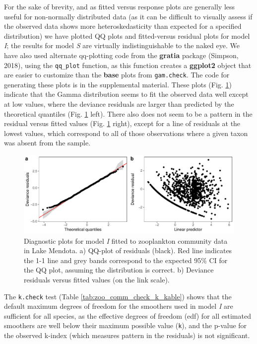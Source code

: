\documentclass[12pt]{article}
\begin{document}
For the sake of brevity, and as fitted versus response plots are
generally less useful for non-normally distributed data (as it can be
difficult to visually assess if the observed data shows more
heteroskedasticity than expected for a specified distribution) we have
plotted QQ plots and fitted-versus residual plots for model \emph{I};
the results for model \emph{S} are virtually indistinguishable to the
naked eye. We have also used alternate qq-plotting code from the
\textbf{gratia} package (Simpson, 2018), using the \texttt{qq\_plot}
function, as this function creates a \textbf{ggplot2} object that are
easier to customize than the \textbf{base} plots from
\texttt{gam.check}. The code for generating these plots is in the
supplemental material. These plots (Fig. \ref{fig:zoo_comm_diag_plot})
indicate that the Gamma distribution seems to fit the observed data well
except at low values, where the deviance residuals are larger than
predicted by the theoretical quantiles (Fig.
\ref{fig:zoo_comm_diag_plot} left). There also does not seem to be a
pattern in the residual versus fitted values (Fig.
\ref{fig:zoo_comm_diag_plot} right), except for a line of residuals at
the lowest values, which correspond to all of those observations where a
given taxon was absent from the sample.

\begin{figure}
\centering
\includegraphics{../figures/zoo_comm_diag-1.pdf}
\caption{\label{fig:zoo_comm_diag_plot} Diagnostic plots for model
\emph{I} fitted to zooplankton community data in Lake Mendota. a)
QQ-plot of residuals (black). Red line indicates the 1-1 line and grey
bands correspond to the expected 95\% CI for the QQ plot, assuming the
distribution is correct. b) Deviance residuals versus fitted values (on
the link scale).}
\end{figure}

The \texttt{k.check} test (Table \ref{tab:zoo_comm_check_k_kable}) shows
that the default maximum degrees of freedom for the smoothers used in
model \emph{I} are sufficient for all species, as the effective degrees
of freedom (edf) for all estimated smoothers are well below their
maximum possible value (\texttt{k\textquotesingle{}}), and the p-value
for the observed k-index (which measures pattern in the residuals) is
not significant.
\end{document}
